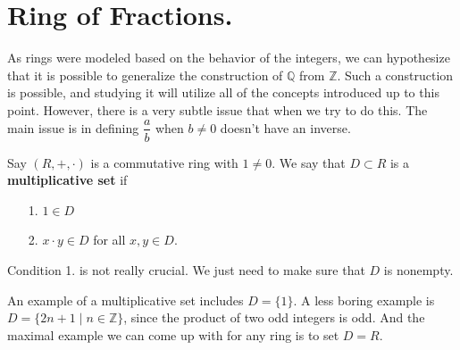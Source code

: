 \documentclass[12pt,letterpaper]{algebra_book}
\theoremstyle{definition}
\begin{document}
    \newpage
    \section{Ring of Fractions.}
    As rings were modeled based on the behavior of the integers,
    we can hypothesize that it is possible to generalize the
    construction of $\mathbb{Q}$ from 
    $\mathbb{Z}$. Such a construction is possible, and studying it
    will utilize all of the concepts introduced up to this point. 
    However, there is a very subtle issue that
    when we try to do this. The main issue is in defining
    $\dfrac{a}{b}$ when $b \ne 0 $ doesn't have an inverse.
    
    \begin{definition}
        Say $(R, +, \cdot)$ is a commutative ring with $1 \ne 0$.
        We say that $D \subset R$ is a \textbf{multiplicative set}
        if 
        \begin{itemize}
            \item[1.] $1 \in D$
            \item[2.] $x \cdot y \in D$ for all $x, y \in D$.  
        \end{itemize}
        Condition 1. is not really crucial. We just need to make
        sure that $D$ is nonempty. 
    \end{definition}
    An example of a multiplicative set includes $D = \{1\}$. A
    less boring example is $D = \{2n+1 \mid n \in \mathbb{Z}\}$,
    since the product of two odd integers is odd. And the maximal
    example we can come up with for any ring is to set $D = R$. 
\end{document}
